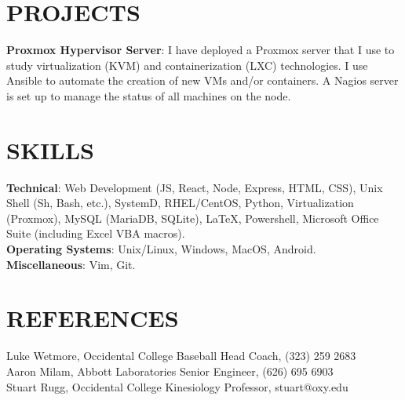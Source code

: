 \documentclass[margin]{res}
\begin{document}
\begin{resume}
\section{PROJECTS}
\par
\textbf{Proxmox Hypervisor Server}:
I have deployed a Proxmox server that I use to study virtualization (KVM) and containerization (LXC) technologies. I use Ansible to automate the creation of new VMs and/or containers. A Nagios server is set up to manage the status of all machines on the node.

\section{SKILLS}

\textbf{Technical}: Web Development (JS, React, Node, Express, HTML, CSS), Unix Shell (Sh, Bash, etc.), SystemD, RHEL/CentOS, Python, Virtualization (Proxmox), MySQL (MariaDB, SQLite), \LaTeX, Powershell, Microsoft Office Suite (including Excel VBA macros).
\\
\textbf{Operating Systems}: Unix/Linux, Windows, MacOS, Android.
\\
\textbf{Miscellaneous}: Vim, Git.

\section{REFERENCES}
Luke Wetmore, Occidental College Baseball Head Coach, (323) 259 2683 \\
Aaron Milam, Abbott Laboratories Senior Engineer, (626) 695 6903 \\
Stuart Rugg, Occidental College Kinesiology Professor, stuart@oxy.edu
\end{resume}
\end{document}
